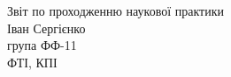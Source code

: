 \begin{titlepage}
  \vspace*{\fill}

  \begin{center}
    {\Large Звіт по проходженню наукової практики}\\[.5cm]
    {\Large 
      Іван Сергієнко\\
      група ФФ-11\\[.4cm]
      ФТІ, КПІ}\\[.4cm]
    \date{}
  \end{center}
  \vspace*{\fill}
\end{titlepage}
